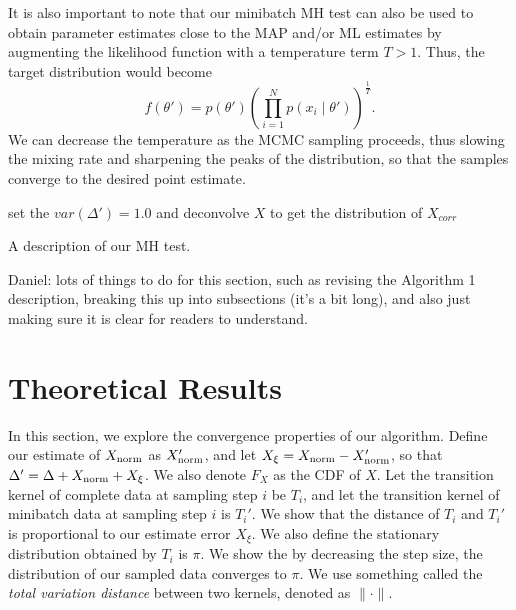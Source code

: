 \documentclass{article}
\begin{document}
It is also important to note that our minibatch MH test can also be used to obtain parameter
estimates close to the MAP and/or ML estimates by augmenting the likelihood function with a
temperature term $T > 1$. Thus, the target distribution would become
\begin{equation}
\label{eq:temperature} f(\theta') = p(\theta')\left ( \prod_{i=1}^N p(x_i \mid \theta')\right)^{\frac{1}{T}}.
\end{equation}
We can decrease the temperature as the MCMC sampling proceeds, thus slowing the mixing rate and
sharpening the peaks of the distribution, so that the samples converge to the desired point estimate.

\begin{algorithm}[t]
set the $var(\Delta') = 1.0$ and deconvolve $X$ to get the distribution of $X_{corr}$\;
\caption{A description of our MH test.}
\label{alg:our_algorithm}
\end{algorithm}

{\color{blue}
Daniel: lots of things to do for this section, such as revising the Algorithm 1 description,
breaking this up into subsections (it's a bit long), and also just making sure it is clear for
readers to understand.
}




\section{Theoretical Results}\label{sec:theory}

In this section, we explore the convergence properties of our algorithm.  Define our estimate of
$X_{\rm norm}$ as $X_{\rm norm}'$, and let $X_{\xi} = X_{\rm norm} - X_{\rm norm}'$, so that
$\Delta' = \Delta + X_{\rm norm} + X_\xi$.  We also denote $F_X$ as the CDF of $X$.  Let the
transition kernel of complete data at sampling step $i$ be $T_i$, and let the transition kernel of
minibatch data at sampling step $i$ is $T_i'$.  We show that the distance of $T_i$ and $T_i'$ is
proportional to our estimate error $X_{\xi}$. We also define the stationary distribution obtained
by $T_i$ is $\pi$.  We show the by decreasing the step size, the distribution of our sampled data
converges to $\pi$. We use something called the \emph{total variation distance} between two kernels,
denoted as $\| \cdot \|$.
\end{document}
